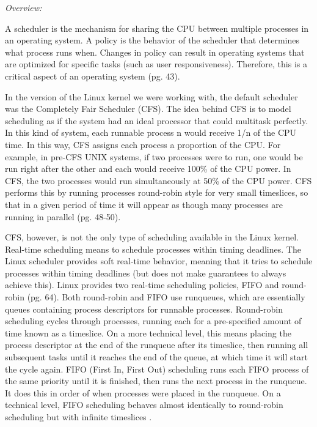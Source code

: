\documentclass[letterpaper,10pt,titlepage]{article}
\newcommand{\tab}{\hspace*{2em}} %
\begin{document}
\emph{Overview:} 

\tab A scheduler is the mechanism for sharing the CPU between multiple processes in an operating system. A policy is the behavior of the scheduler that determines what process runs when. Changes in policy can result in operating systems that are optimized for specific tasks (such as user responsiveness). Therefore, this is a critical aspect of an operating system \cite{Love}(pg. 43). 

\tab In the version of the Linux kernel we were working with, the default scheduler was the Completely Fair Scheduler (CFS). The idea behind CFS is to model scheduling as if the system had an ideal processor that could multitask perfectly. In this kind of system, each runnable process n would receive 1/n of the CPU time. In this way, CFS assigns each process a proportion of the CPU. For example, in pre-CFS UNIX systems, if two processes were to run, one would be run right after the other and each would receive 100\% of the CPU power. In CFS, the two processes would run simultaneously at 50\% of the CPU power. CFS performs this by running processes round-robin style for very small timeslices, so that in a given period of time it will appear as though many processes are running in parallel \cite{Love}(pg. 48-50).

\tab CFS, however, is not the only type of scheduling available in the Linux kernel. Real-time scheduling means to schedule processes within timing deadlines. The Linux scheduler provides soft real-time behavior, meaning that it tries to schedule processes within timing deadlines (but does not make guarantees to always achieve this). Linux provides two real-time scheduling policies, FIFO and round-robin \cite{Love}(pg. 64). Both round-robin and FIFO use runqueues, which are essentially queues containing process descriptors for runnable processes. Round-robin scheduling cycles through processes, running each for a pre-specified amount of time known as a timeslice. On a more technical level, this means placing the process descriptor at the end of the runqueue after its timeslice, then running all subsequent tasks until it reaches the end of the queue, at which time it will start the cycle again. FIFO (First In, First Out) scheduling runs each FIFO process of the same priority until it is finished, then runs the next process in the runqueue. It does this in order of when processes were placed in the runqueue. On a technical level, FIFO scheduling behaves almost identically to round-robin scheduling but with infinite timeslices \cite{Bovet}.
\end{document}
